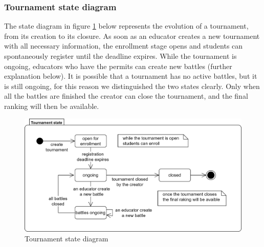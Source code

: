 \subsubsection*{Tournament state diagram}
The state diagram in figure \ref{fig:tournament_state} below represents the evolution of a tournament, from its creation to its closure. \newline
As soon as an educator creates a new tournament with all necessary information, the enrollment stage opens and students can spontaneously register until the deadline expires. \newline
While the tournament is ongoing, educators who have the permits can create new battles (further explanation below). It is possible that a tournament has no active battles, but it is still ongoing, for this reason we distinguished the two states clearly. \newline
Only when all the battles are finished the creator can close the tournament, and the final ranking will then be available.
\begin{figure}[H]
    \centering
    \includegraphics[scale=0.7]{images/tournament_state.png}
    \caption{Tournament state diagram}
    \label{fig:tournament_state}
\end{figure}


